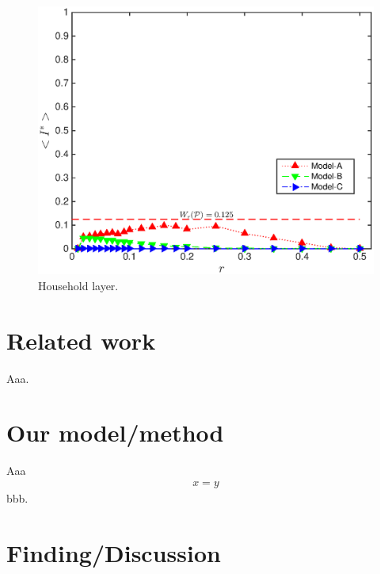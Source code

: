\documentclass[10pt,journal,compsoc]{IEEEtran}
\theoremstyle{plain}
\theoremstyle{definition}
\theoremstyle{remark}
\begin{document}
\begin{figure}[htbp]
\begin{center}
	\includegraphics[width=\columnwidth]
		{Fig-FigureA}
	\caption{Household layer.}
	\label{fig:figureA}
\end{center}
\end{figure}




\section{Related work}

Aaa.




\section{Our model/method}

Aaa
\begin{align}
	x = y
	\label{eq:bbb}
\end{align}
bbb.




\section{Finding/Discussion}
\end{document}

